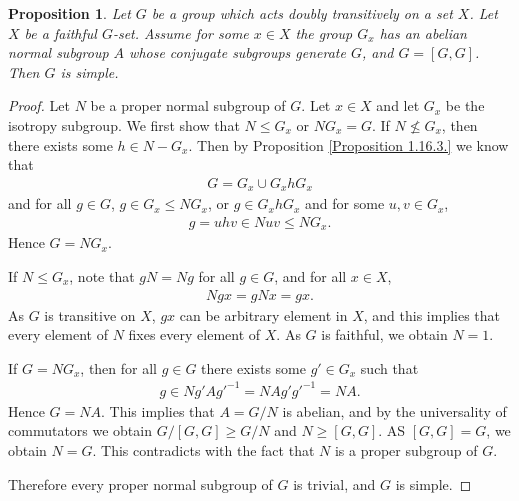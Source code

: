 \documentclass[12pt]{report}
\theoremstyle{plain}
\newtheorem{proposition}[theorem]{Proposition}
\theoremstyle{remark}
\theoremstyle{definition}
\begin{document}
\begin{proposition}\label{Proposition 1.16.4.}
    Let $G$ be a group which acts doubly transitively on a set $X$. Let $X$ be a faithful $G$-set. Assume for some $x\in X$ the group $G_x$ has an abelian normal subgroup $A$ whose conjugate subgroups generate $G$, and $G=[G,G]$. Then $G$ is simple.
\end{proposition}
\begin{proof}
    Let $N$ be a proper normal subgroup of $G$. Let $x\in X$ and let $G_x$ be the isotropy subgroup. We first show that $N\le G_x$ or $NG_x = G$. If $N\not\le G_x$, then there exists some $h\in N-G_x$. Then by Proposition \ref{Proposition 1.16.3.} we know that
    \begin{align*}
        G = G_x \cup G_x h G_x
    \end{align*}
    and for all $g\in G$, $g\in G_x\le NG_x$, or $g\in G_xhG_x$ and for some $u,v\in G_x$,
    \begin{align*}
        g = uhv \in Nuv \le NG_x.
    \end{align*}
    Hence $G=NG_x$.
    
    If $N\le G_x$, note that $gN=Ng$ for all $g\in G$, and for all $x\in X$,
    \begin{align*}
        Ngx = gNx = gx.
    \end{align*}
    As $G$ is transitive on $X$, $gx$ can be arbitrary element in $X$, and this implies that every element of $N$ fixes every element of $X$. As $G$ is faithful, we obtain $N=1$.

    If $G=NG_x$, then for all $g\in G$ there exists some $g'\in G_x$ such that
    \begin{align*}
        g \in Ng'Ag'^{-1} = NAg'g'^{-1} = NA.
    \end{align*}
    Hence $G=NA$. This implies that $A=G/N$ is abelian, and by the universality of commutators we obtain $G/[G,G]\ge G/N$ and $N\ge [G,G]$. AS $[G,G]=G$, we obtain $N=G$. This contradicts with the fact that $N$ is a proper subgroup of $G$.

    Therefore every proper normal subgroup of $G$ is trivial, and $G$ is simple.
\end{proof}
\end{document}

